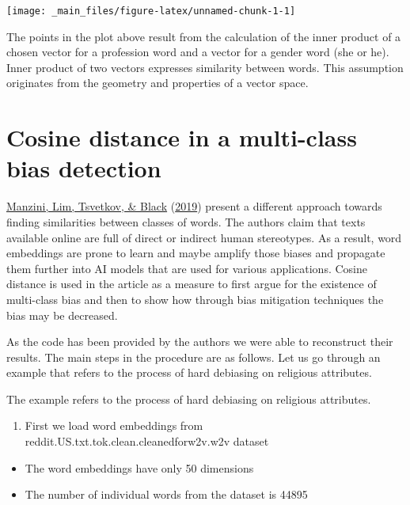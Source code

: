 \documentclass[
  12pt,
]{book}
\providecommand{\tightlist}{%
  \setlength{\itemsep}{0pt}\setlength{\parskip}{0pt}}
\begin{document}
\vspace{1mm}
\footnotesize

\begin{center}\texttt{[image: \_main\_files/figure-latex/unnamed-chunk-1-1]} \end{center}
\normalsize

The points in the plot above result from the calculation of the inner product of a chosen vector for a profession word and a vector for a gender word (she or he). Inner product of two vectors expresses similarity between words. This assumption originates from the geometry and properties of a vector space.

\hypertarget{cosine-distance-in-a-multi-class-bias-detection}{%
\section{Cosine distance in a multi-class bias detection}\label{cosine-distance-in-a-multi-class-bias-detection}}

\protect\hyperlink{ref-manzini2019black}{Manzini, Lim, Tsvetkov, \& Black} (\protect\hyperlink{ref-manzini2019black}{2019}) present a different approach towards finding similarities between classes of words. The authors claim that texts available online are full of direct or indirect human stereotypes. As a result, word embeddings are prone to learn and maybe amplify those biases and propagate them further into AI models that are used for various applications. Cosine distance is used in the article as a measure to first argue for the existence of multi-class bias and then to show how through bias mitigation techniques the bias may be decreased.

As the code has been provided by the authors we were able to reconstruct their results. The main steps in the procedure are as follows. Let us go through an example that refers to the process of hard debiasing on religious attributes.

The example refers to the process of hard debiasing on religious attributes.

\begin{enumerate}
\def\labelenumi{\arabic{enumi}.}
\tightlist
\item
  First we load word embeddings from reddit.US.txt.tok.clean.cleanedforw2v.w2v dataset
\end{enumerate}

\begin{itemize}
\tightlist
\item
  The word embeddings have only 50 dimensions
\item
  The number of individual words from the dataset is 44895
\end{itemize}
\end{document}
